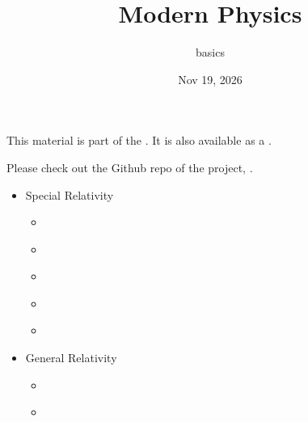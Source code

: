 \documentclass[letterpaper,10pt,english]{jupyterBook}
\title{Modern Physics}
\date{Nov 19, 2026}
\author{basics}
\begin{document}
\pagestyle{empty}
\sphinxmaketitle
\pagestyle{plain}
\sphinxtableofcontents
\pagestyle{normal}
\label{\detokenize{intro::doc}}


\sphinxAtStartPar
This material is part of the . It is also available as a .

\sphinxAtStartPar
Please check out the Github repo of the project, .
\begin{itemize}
\item {} 
\sphinxAtStartPar
Special Relativity

\begin{itemize}
\item {} 
\sphinxAtStartPar
{\hyperref[\detokenize{ch/relativity-special/intro::doc}]{}}

\item {} 
\sphinxAtStartPar
{\hyperref[\detokenize{ch/relativity-special/notes::doc}]{}}

\item {} 
\sphinxAtStartPar
{\hyperref[\detokenize{ch/relativity-special/lorentz::doc}]{}}

\item {} 
\sphinxAtStartPar
{\hyperref[\detokenize{ch/relativity-special/em::doc}]{}}

\item {} 
\sphinxAtStartPar
{\hyperref[\detokenize{ch/relativity-special/rindler::doc}]{}}

\end{itemize}
\end{itemize}
\begin{itemize}
\item {} 
\sphinxAtStartPar
General Relativity

\begin{itemize}
\item {} 
\sphinxAtStartPar
{\hyperref[\detokenize{ch/relativity-general/intro::doc}]{}}

\item {} 
\sphinxAtStartPar
{\hyperref[\detokenize{ch/relativity-general/notes::doc}]{}}

\end{itemize}
\end{itemize}
\end{document}
